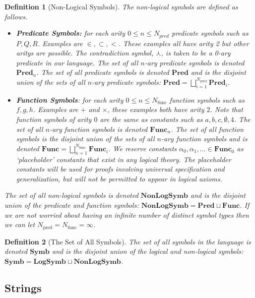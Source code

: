 \documentclass[12pt]{article}
\theoremstyle{break}
\newtheorem{definition}{Definition}[section]
\theoremstyle{break}
\theoremstyle{break}
\theoremstyle{break}
\theoremstyle{break}
\newtheorem{informal definition}[definition]{Informal Definition}
\begin{document}
\begin{definition}[Non-Logical Symbols]
The non-logical symbols are defined as follows.
\begin{itemize}
\item{\textbf{Predicate Symbols:} for each arity $0 \le n \le N_{pred}$ predicate symbols such as $P, Q, R$. Examples are $\in, \subset, <$. These examples all have arity 2 but other aritys are possible. The contradiction symbol, $\curlywedge$, is taken to be a 0-ary predicate in our language. The set of all $n$-ary predicate symbols is denoted $\textbf{Pred}_n$. The set of all predicate symbols is denoted $\textbf{Pred}$ and is the disjoint union of the sets of all $n$-ary predicate symbols: $\textbf{Pred} = \bigsqcup_{i=1}^{N_{\text{pred}}} \textbf{Pred}_i$.}
\item{\textbf{Function Symbols}: for each arity $0 \le n \le N_{\text{func}}$ function symbols such as $f, g, h$. Examples are $+$ and $\times$, these examples both have arity $2$. Note that function symbols of arity $0$ are the same as constants such as $a,b,c,\emptyset,4$. The set of all $n$-ary function symbols is denoted $\textbf{Func}_n$. The set of all function symbols is the disjoint union of the sets of all $n$-ary function symbols and is denoted $\textbf{Func} = \bigsqcup_{n=1}^{N_{\text{func}}} \textbf{Func}_i$. We reserve constants $\alpha_0, \alpha_1, \ldots \in \textbf{Func}_0$ as `placeholder' constants that exist in any logical theory. The placeholder constants will be used for proofs involving universal specification and generalization, but will not be permitted to appear in logical axioms.}
\end{itemize}

The set of all non-logical symbols is denoted $\textbf{NonLogSymb}$ and is the disjoint union of the predicate and function symbols: $\textbf{NonLogSymb} = \textbf{Pred} \sqcup \textbf{Func}$. If we are not worried about having an infinite number of distinct symbol types then we can let $N_{\text{pred}} = N_{\text{func}} = \infty$.
\end{definition}

\begin{definition}[The Set of All Symbols]
The set of all symbols in the language is denoted $\textbf{Symb}$ and is the disjoint union of the logical and non-logical symbols: $\textbf{Symb} = \textbf{LogSymb} \sqcup \textbf{NonLogSymb}$.
\end{definition}

\subsection{Strings}
\end{document}
